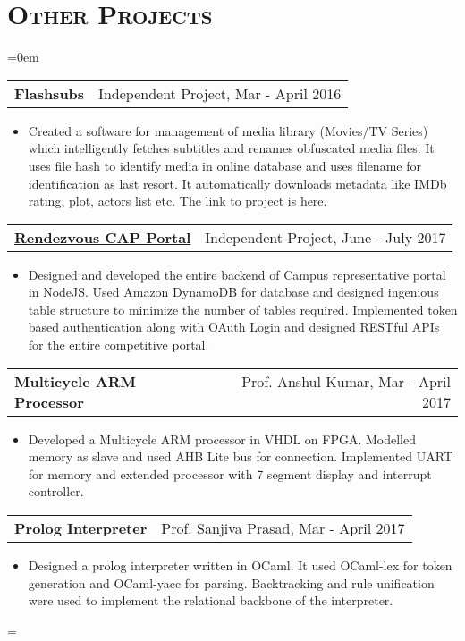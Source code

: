 \documentclass{article}
\makeatletter
\newenvironment{longversion}{}{} %
\newenvironment{absolutelynopagebreak}
  {\par\nobreak\vfil\penalty0\vfilneg
   \vtop\bgroup}
  {\par\xdef\tpd{\the\prevdepth}\egroup
   \prevdepth=\tpd}
\newcommand{\headerrow}[2]
{\begin{tabular*}{\linewidth}{l@{\extracolsep{\fill}}r}
	#1 &
	#2 \\
\end{tabular*}}
\newcommand{\tmpsection}[1]{}
\let\tmpsection=\section
\renewcommand{\section}[1]{\tmpsection*{\textsc{#1}}}
\makeatother
\begin{document}
\begin{absolutelynopagebreak}
\begin{longversion}
\section{Other Projects}
\begin{list} {}{\leftmargin=0em}
\setlength{\leftmargin}{0pt}

\item[]
\headerrow {\textbf{Flashsubs}} {Independent Project, Mar - April 2016}
\begin{itemize} \item[]
Created a software for management of media library (Movies/TV Series) which intelligently fetches subtitles and renames obfuscated media files. It uses file hash to identify media in online database and uses filename for identification as last resort. It automatically downloads metadata like IMDb rating, plot, actors list etc. The link to project is \href{https://github.com/ozym4nd145/FlashSubs}{here}.
\end{itemize}

\headerrow {\textbf{\href{http://cap.rdv-iitd.com}{Rendezvous CAP Portal}}} {Independent Project, June - July 2017}
\begin{itemize} \item[]
Designed and developed the entire backend of Campus representative portal in NodeJS. Used Amazon DynamoDB for database and designed ingenious table structure to minimize the number of tables required. Implemented token based authentication along with OAuth Login and designed RESTful APIs for the entire competitive portal.
\end{itemize}


\item[]
\headerrow {\textbf{Multicycle ARM Processor}}{Prof. Anshul Kumar, Mar - April 2017}
\begin{itemize} \item[]
Developed a Multicycle ARM processor in VHDL on FPGA. Modelled memory as slave and used AHB Lite bus for connection. Implemented UART for memory and extended processor with 7 segment display and interrupt controller.
\end{itemize}

\item[]
\headerrow {\textbf{Prolog Interpreter}}{Prof. Sanjiva Prasad, Mar - April 2017}
\begin{itemize} \item[] 
Designed a prolog interpreter written in OCaml. It used OCaml-lex for token generation and OCaml-yacc for parsing. Backtracking and rule unification were used to implement the relational backbone of the interpreter.
\end{itemize}


\end{list}
\end{longversion}
\end{absolutelynopagebreak}
\end{document}
